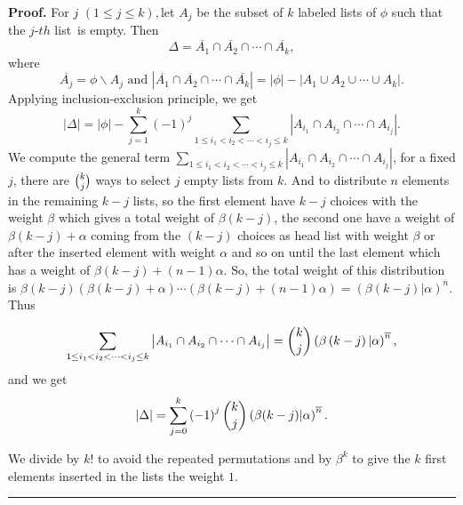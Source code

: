 \documentclass{article}
\newenvironment{proof}[1][Proof]{\noindent\textbf{#1.} }{\ \rule{0.5em}{0.5em}}
\begin{document}
\begin{proof}
For $j$ $\left( 1\leq j\leq k\right), $let $A_{j}$ be the subset of $k$
labeled lists of $\phi $ such that the $j$-$th$ list\ is empty. Then
\begin{equation*}
\Delta =\overline{A_{1}}\cap \overline{A_{2}}\cap \cdots \cap \overline{A_{k}},
\end{equation*}
where
\begin{equation*}
\overline{A_{j}}=\phi \backslash A_{j}\text{ \ and \ }\left\vert
\overline{A_{1}}\cap \overline{A_{2}}\cap \cdots \cap \overline{A_{k}}%
\right\vert =\left\vert \phi \right\vert -\left\vert A_{1}\cup A_{2}\cup
\cdots \cup A_{k}\right\vert .
\end{equation*}
Applying inclusion-exclusion principle, we get%
\begin{equation}
\left\vert \Delta \right\vert =\left\vert \phi \right\vert
-\sum_{j=1}^{k}\left( -1\right) ^{j}\sum_{1\leq i_{1}<i_{2}<\cdots
<i_{j}\leq k}\left\vert A_{i_{1}}\cap A_{i_{2}}\cap \cdots \cap A_{i_{j}}\right\vert .
\end{equation}%
We compute the general term $\sum_{1\leq i_{1}<i_{2}<\cdots <i_{j}\leq k}\left\vert A_{i_{1}}\cap A_{i_{2}}\cap \cdots \cap A_{i_{j}}\right\vert $,
for a fixed $j$, there are $\tbinom{k}{j}$ ways to select $j$ empty lists
from $k$. And to distribute $n$ elements in the remaining $k-j$ lists, so
the first element have $k-j$ choices with the weight $\beta $ which gives a total weight of $\beta \left( k-j\right)$,
the second one have a weight of $\beta \left( k-j\right)+\alpha $
 coming from the $\left( k-j\right) $ choices as head
list with weight $\beta $ or after the inserted element with weight $\alpha $
and so on until the last element which has a weight of $\beta \left( k-j\right)
+(n-1)\alpha $. So, the total weight of this distribution is $\beta \left(
k-j\right) \left( \beta \left( k-j\right) +\alpha \right) \cdots \left(
\beta \left( k-j\right) +(n-1)\alpha \right) =\left( \beta \left( k-j\right)
|\alpha \right) ^{\overline{n}}.$ Thus%

\begin{equation*}
\sum_{1\leq i_{1}<i_{2}<\cdots <i_{j}\leq k}\left\vert A_{i_{1}}\cap
A_{i_{2}}\cap \cdots \cap A_{i_{j}}\right\vert =\dbinom{k}{j}\left( \beta
\left( k-j\right) |\alpha \right) ^{\overline{n}},
\end{equation*}%
and we get%
\begin{equation*}
\left\vert \Delta \right\vert =\sum_{j=0}^{k}\left( -1\right) ^{j}\dbinom{k}{%
j}\left( \beta (k-j)|\alpha \right) ^{\overline{n}}.
\end{equation*}

We divide by $k!$ to avoid the repeated permutations and by $\beta ^{k}$ to
give the $k$ first elements inserted in the lists the weight $1$.
\end{proof}
\end{document}
